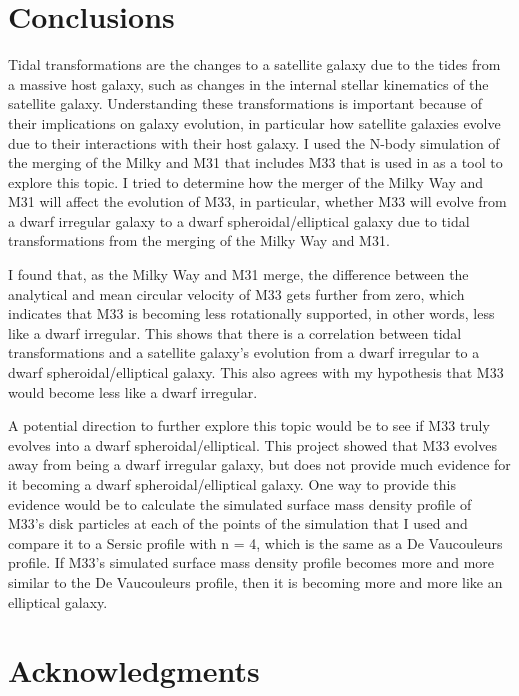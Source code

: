 \documentclass[trackchanges, twocolumn]{aastex7}
\begin{document}
\section{Conclusions}

Tidal transformations are the changes to a satellite galaxy due to the tides from a massive host galaxy, such as changes in the internal stellar kinematics of the satellite galaxy. Understanding these transformations is important because of their implications on galaxy evolution, in particular how satellite galaxies evolve due to their interactions with their host galaxy. I used the N-body simulation of the merging of the Milky and M31 that includes M33 that is used in \cite{MarelBesla2012} as a tool to explore this topic. I tried to determine how the merger of the Milky Way and M31 will affect the evolution of M33, in particular, whether M33 will evolve from a dwarf irregular galaxy to a dwarf spheroidal/elliptical galaxy due to tidal transformations from the merging of the Milky Way and M31.

I found that, as the Milky Way and M31 merge, the difference between the analytical and mean circular velocity of M33 gets further from zero, which indicates that M33 is becoming less rotationally supported, in other words, less like a dwarf irregular. This shows that there is a correlation between tidal transformations and a satellite galaxy's evolution from a dwarf irregular to a dwarf spheroidal/elliptical galaxy. This also agrees with my hypothesis that M33 would become less like a dwarf irregular.

A potential direction to further explore this topic would be to see if M33 truly evolves into a dwarf spheroidal/elliptical. This project showed that M33 evolves away from being a dwarf irregular galaxy, but does not provide much evidence for it becoming a dwarf spheroidal/elliptical galaxy. One way to provide this evidence would be to calculate the simulated surface mass density profile of M33's disk particles at each of the points of the simulation that I used and compare it to a Sersic profile \citep{Sersic1963} with n = 4, which is the same as a De Vaucouleurs profile. If M33's simulated surface mass density profile becomes more and more similar to the De Vaucouleurs profile, then it is becoming more and more like an elliptical galaxy.

\section{Acknowledgments}
\end{document}
